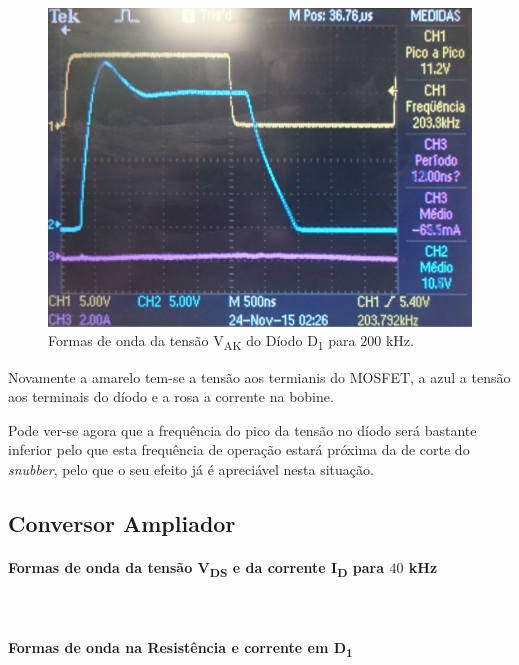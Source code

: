 \documentclass[a4paper,11pt]{article}
\numberwithin{equation}{section}
\begin{document}
\begin{figure}[H]
	\centering
	\includegraphics[keepaspectratio=true, scale=0.175]{img/figs/vak_hf_buck}
	\caption{Formas de onda da tensão V\textsubscript{AK} do Díodo D\textsubscript{1} para $200$ kHz.}
	\label{fig:vak_hf_buck}
	\vspace{-0.8em}
\end{figure}

Novamente a amarelo tem-se a tensão aos termianis do MOSFET, a azul a tensão aos terminais do díodo e a rosa a corrente na bobine.

Pode ver-se agora que a frequência do pico da tensão no díodo será bastante inferior pelo que esta frequência de operação estará próxima da de corte do \textit{snubber}, pelo que o seu efeito já é apreciável nesta situação.

\subsection{Conversor Ampliador}

\paragraph{Formas de onda da tensão V\textsubscript{DS} e da corrente I\textsubscript{D} para $40$ kHz}\mbox{}\

\paragraph{Formas de onda na Resistência e corrente em D\textsubscript{1}}\mbox{}\
\end{document}
